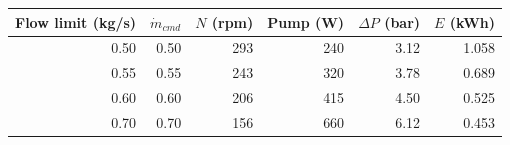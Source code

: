 \begin{tabular}{rrrrrr}
\toprule
Flow limit (kg/s) & $\dot m_{cmd}$ & $N$ (rpm) & Pump (W) & $\Delta P$ (bar) & $E$ (kWh) \\
\midrule
0.50 & 0.50 & 293 & 240 & 3.12 & 1.058 \\
0.55 & 0.55 & 243 & 320 & 3.78 & 0.689 \\
0.60 & 0.60 & 206 & 415 & 4.50 & 0.525 \\
0.70 & 0.70 & 156 & 660 & 6.12 & 0.453 \\
\bottomrule
\end{tabular}

